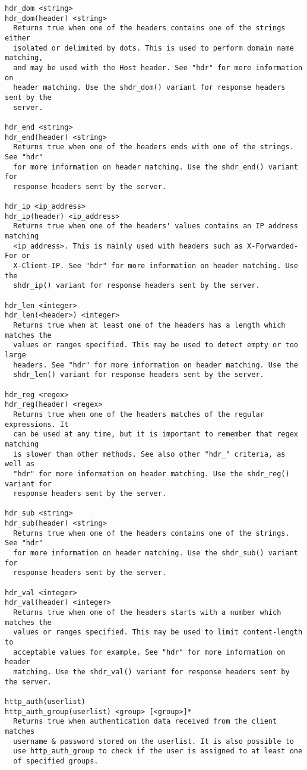 \begin{verbatim}
hdr_dom <string>
hdr_dom(header) <string>
  Returns true when one of the headers contains one of the strings either
  isolated or delimited by dots. This is used to perform domain name matching,
  and may be used with the Host header. See "hdr" for more information on
  header matching. Use the shdr_dom() variant for response headers sent by the
  server.

hdr_end <string>
hdr_end(header) <string>
  Returns true when one of the headers ends with one of the strings. See "hdr"
  for more information on header matching. Use the shdr_end() variant for
  response headers sent by the server.

hdr_ip <ip_address>
hdr_ip(header) <ip_address>
  Returns true when one of the headers' values contains an IP address matching
  <ip_address>. This is mainly used with headers such as X-Forwarded-For or
  X-Client-IP. See "hdr" for more information on header matching. Use the
  shdr_ip() variant for response headers sent by the server.

hdr_len <integer>
hdr_len(<header>) <integer>
  Returns true when at least one of the headers has a length which matches the
  values or ranges specified. This may be used to detect empty or too large
  headers. See "hdr" for more information on header matching. Use the
  shdr_len() variant for response headers sent by the server.

hdr_reg <regex>
hdr_reg(header) <regex>
  Returns true when one of the headers matches of the regular expressions. It
  can be used at any time, but it is important to remember that regex matching
  is slower than other methods. See also other "hdr_" criteria, as well as
  "hdr" for more information on header matching. Use the shdr_reg() variant for
  response headers sent by the server.

hdr_sub <string>
hdr_sub(header) <string>
  Returns true when one of the headers contains one of the strings. See "hdr"
  for more information on header matching. Use the shdr_sub() variant for
  response headers sent by the server.

hdr_val <integer>
hdr_val(header) <integer>
  Returns true when one of the headers starts with a number which matches the
  values or ranges specified. This may be used to limit content-length to
  acceptable values for example. See "hdr" for more information on header
  matching. Use the shdr_val() variant for response headers sent by the server.

http_auth(userlist)
http_auth_group(userlist) <group> [<group>]*
  Returns true when authentication data received from the client matches
  username & password stored on the userlist. It is also possible to
  use http_auth_group to check if the user is assigned to at least one
  of specified groups.


\end{verbatim}
